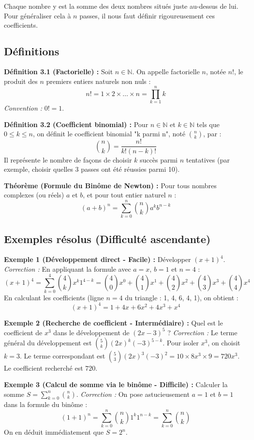 \documentclass[12pt,a4paper]{report}
\begin{document}
Chaque nombre y est la somme des deux nombres situés juste au-dessus de lui. Pour généraliser cela à $n$ passes, il nous faut définir rigoureusement ces coefficients.

\subsection{Définitions}

\textbf{Définition 3.1 (Factorielle) :} Soit $n \in \mathbb{N}$. On appelle factorielle $n$, notée $n!$, le produit des $n$ premiers entiers naturels non nuls :
$$ n! = 1 \times 2 \times \dots \times n = \prod_{k=1}^n k $$
\textit{Convention :} $0! = 1$.

\textbf{Définition 3.2 (Coefficient binomial) :} Pour $n \in \mathbb{N}$ et $k \in \mathbb{N}$ tels que $0 \le k \le n$, on définit le coefficient binomial "k parmi n", noté $\binom{n}{k}$, par :
$$ \binom{n}{k} = \frac{n!}{k!(n-k)!} $$
Il représente le nombre de façons de choisir $k$ succès parmi $n$ tentatives (par exemple, choisir quelles 3 passes ont été réussies parmi 10).

\textbf{Théorème (Formule du Binôme de Newton) :} Pour tous nombres complexes (ou réels) $a$ et $b$, et pour tout entier naturel $n$ :
$$ (a+b)^n = \sum_{k=0}^n \binom{n}{k} a^k b^{n-k} $$

\subsection{Exemples résolus (Difficulté ascendante)}

\textbf{Exemple 1 (Développement direct - Facile) :} 
Développer $(x+1)^4$.
\textit{Correction :} En appliquant la formule avec $a=x$, $b=1$ et $n=4$ :
$$ (x+1)^4 = \sum_{k=0}^4 \binom{4}{k} x^k 1^{4-k} = \binom{4}{0}x^0 + \binom{4}{1}x^1 + \binom{4}{2}x^2 + \binom{4}{3}x^3 + \binom{4}{4}x^4 $$
En calculant les coefficients (ligne $n=4$ du triangle : 1, 4, 6, 4, 1), on obtient :
$$ (x+1)^4 = 1 + 4x + 6x^2 + 4x^3 + x^4 $$

\textbf{Exemple 2 (Recherche de coefficient - Intermédiaire) :}
Quel est le coefficient de $x^3$ dans le développement de $(2x - 3)^5$ ?
\textit{Correction :} Le terme général du développement est $\binom{5}{k} (2x)^k (-3)^{5-k}$.
Pour isoler $x^3$, on choisit $k=3$.
Le terme correspondant est $\binom{5}{3} (2x)^3 (-3)^2 = 10 \times 8x^3 \times 9 = 720x^3$.
Le coefficient recherché est $720$.

\textbf{Exemple 3 (Calcul de somme via le binôme - Difficile) :}
Calculer la somme $S = \sum_{k=0}^n \binom{n}{k}$.
\textit{Correction :} On pose astucieusement $a = 1$ et $b = 1$ dans la formule du binôme :
$$ (1+1)^n = \sum_{k=0}^n \binom{n}{k} 1^k 1^{n-k} = \sum_{k=0}^n \binom{n}{k} $$
On en déduit immédiatement que $S = 2^n$. 
\end{document}
